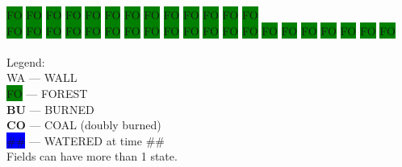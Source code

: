 \colorbox{green}{\color[gray]{0.75}FO}%
\colorbox{green}{\color[gray]{0.75}FO}%
\colorbox{green}{\color[gray]{0.75}FO}%
\colorbox{green}{\color[gray]{0.75}FO}%
\colorbox{green}{\color[gray]{0.75}FO}%
\colorbox{green}{\color[gray]{0.75}FO}%
\colorbox{green}{\color[gray]{0.75}FO}%
\colorbox{green}{\color[gray]{0.75}FO}%
\colorbox{green}{\color[gray]{0.75}FO}%
\colorbox{green}{\color[gray]{0.75}FO}%
\colorbox{green}{\color[gray]{0.75}FO}%
\colorbox{green}{\color[gray]{0.75}FO}%
\colorbox{green}{\color[gray]{0.75}FO}%
\\
\colorbox{green}{\color[gray]{0.75}FO}%
\colorbox{green}{\color[gray]{0.75}FO}%
\colorbox{green}{\color[gray]{0.75}FO}%
\colorbox{green}{\color[gray]{0.75}FO}%
\colorbox{green}{\color[gray]{0.75}FO}%
\colorbox{green}{\color[gray]{0.75}FO}%
\colorbox{green}{\color[gray]{0.75}FO}%
\colorbox{green}{\color[gray]{0.75}FO}%
\colorbox{green}{\color[gray]{0.75}FO}%
\colorbox{green}{\color[gray]{0.75}FO}%
\colorbox{green}{\color[gray]{0.75}FO}%
\colorbox{green}{\color[gray]{0.75}FO}%
\colorbox{green}{\color[gray]{0.75}FO}%
\colorbox{green}{\color[gray]{0.75}FO}%
\colorbox{green}{\color[gray]{0.75}FO}%
\colorbox{green}{\color[gray]{0.75}FO}%
\colorbox{green}{\color[gray]{0.75}FO}%
\colorbox{green}{\color[gray]{0.75}FO}%
\colorbox{green}{\color[gray]{0.75}FO}%
\colorbox{green}{\color[gray]{0.75}FO}%
\\
\\
Legend:\\
\colorbox{white}{\color[gray]{0.5}WA}  ---  WALL\\
\colorbox{green}{\color[gray]{0.5}FO}  ---  FOREST\\
{\color[rgb]{1,0,0}\textbf{BU}}  ---  BURNED\\
{\color[rgb]{0,0,0}\textbf{CO}}  ---  COAL (doubly burned)\\
\colorbox{blue}{\#\#}  ---  WATERED at time \#\#\\
Fields can have more than 1 state.\\
